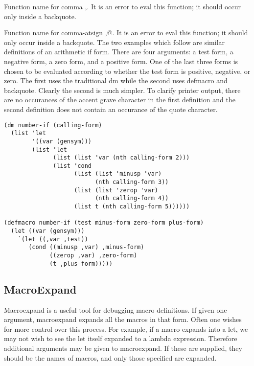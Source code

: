 {    Function name for comma ,.  It is  an  error  to  eval  this
    function; it should occur only inside a backquote.
}

{    Function  name  for comma-atsign ,@.  It is an error to eval
    this function; it should only occur inside a backquote.
}
  The two examples which follow are similar  definitions  of  an
arithmetic  if  form.   There are four arguments: a test form, a
negative form, a zero form, and a positive form.    One  of  the
last  three forms is chosen to be evaluated according to whether
the test form is positive, negative, or zero. The first uses the
traditional dm while the second  uses  defmacro  and  backquote.
Clearly  the second is much simpler.  To clarify printer output,
there are no occurances of the accent  grave  character  in  the
first  definition  and the second definition does not contain an
occurance of the quote character.

\begin{verbatim}
(dm number-if (calling-form)
  (list 'let
        '((var (gensym)))
        (list 'let
              (list (list 'var (nth calling-form 2)))
              (list 'cond
                    (list (list 'minusp 'var)
                          (nth calling-form 3))
                    (list (list 'zerop 'var)
                          (nth calling-form 4))
                    (list t (nth calling-form 5))))))
 
(defmacro number-if (test minus-form zero-form plus-form)
  (let ((var (gensym)))
    `(let ((,var ,test))
       (cond ((minusp ,var) ,minus-form)
             ((zerop ,var) ,zero-form)
             (t ,plus-form)))))
\end{verbatim}

\subsection{MacroExpand}


{    Macroexpand  is  a   useful   tool   for   debugging   macro
    definitions.   If  given  one argument, macroexpand  expands
    all the macros in that form.   Often  one  wishes  for  more
    control  over this process.  For example, if a macro expands
    into a let, we may not wish to see the let  itself  expanded
    to  a lambda expression.  Therefore additional arguments may
    be given to macroexpand.  If these are supplied, they should
    be the  names  of  macros,  and  only  those  specified  are
    expanded.
}

